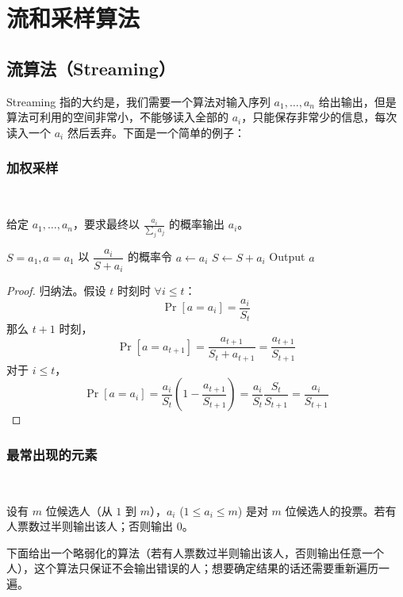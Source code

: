 \chapter{流和采样算法}

\section{流算法（Streaming）}

Streaming 指的大约是，我们需要一个算法对输入序列 $a_1, \dots, a_n$ 给出输出，但是算法可利用的空间非常小，不能够读入全部的 $a_i$，只能保存非常少的信息，每次读入一个 $a_i$ 然后丢弃。下面是一个简单的例子：

\subsection{加权采样} ~

给定 $a_1, \dots, a_n$，要求最终以 $\frac{a_{i}}{\sum_{j}a_{j}}$ 的概率输出 $a_i$。

\begin{algorithm}[h]
    \caption{}
    \begin{algorithmic}[1]
        \State $S = a_{1}, a = a_{1}$
            \State 以 $\dfrac{a_{i}}{S+a_{i}}$ 的概率令 $a \leftarrow a_{i}$
            \State $S \leftarrow S + a_{i}$
        \EndFor
        \State Output $a$
    \end{algorithmic}
\end{algorithm}

\begin{proof}
    归纳法。假设 $t$ 时刻时 $\forall i \le t$：
    \[
        \Pr[a=a_{i}]=\frac{a_{i}}{S_{t}}
    \]
    那么 $t+1$ 时刻，
    \[
        \Pr[a=a_{t+1}]=\frac{a_{t+1}}{S_{t} + a_{t+1}}=\frac{a_{t+1}}{S_{t+1}}
    \]
    对于 $i \le t$，
    \[
        \Pr[a=a_{i}]=\frac{a_{i}}{S_{t}}\left(1-\frac{a_{t+1}}{S_{t+1}}\right)=\frac{a_{i}}{S_{t}}\frac{S_{t}}{S_{t+1}}=\frac{a_{i}}{S_{t+1}}
    \]
\end{proof}

\subsection{最常出现的元素} ~

设有 $m$ 位候选人（从 $1$ 到 $m$），$a_{i}$ ($1\le a_{i}\le m$) 是对 $m$ 位候选人的投票。若有人票数过半则输出该人；否则输出 0。

下面给出一个略弱化的算法（若有人票数过半则输出该人，否则输出任意一个人），这个算法只保证不会输出错误的人；想要确定结果的话还需要重新遍历一遍。

